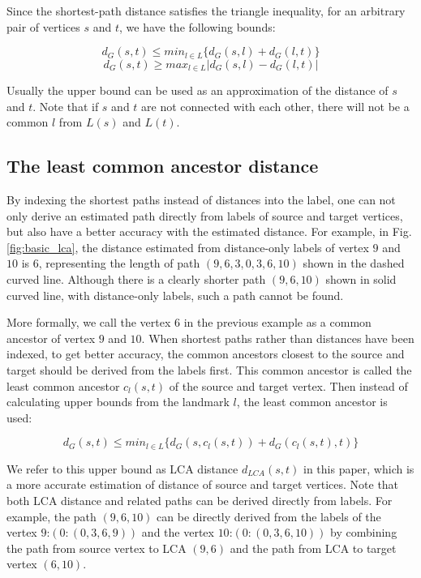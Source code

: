Since the shortest-path distance satisfies the triangle inequality, for an arbitrary pair of vertices $s$ and $t$, we have the following bounds:

\begin{equation}
\label{equ:upper}
    d_G(s,t) \leq min_{l \in L}\{d_G(s,l) + d_G(l,t)\}
\end{equation}
\begin{equation}
\label{equ:lower}
    d_G(s,t) \geq max_{l \in L}|d_G(s,l) - d_G(l,t)|
\end{equation}

Usually the upper bound can be used as an approximation of the distance of $s$ and $t$. Note that if $s$ and $t$ are not connected with each other, there will not be a common $l$ from $L(s)$ and $L(t)$.

\subsection{The least common ancestor distance}

By indexing the shortest paths instead of distances into the label, one can not only derive an estimated path directly from labels of source and target vertices, but also have a better accuracy with the estimated distance. For example, in Fig. \ref{fig:basic_lca}, the distance estimated from distance-only labels of vertex $9$ and $10$ is 6, representing the length of path $(9, 6, 3, 0, 3, 6, 10)$ shown in the dashed curved line. Although there is a clearly shorter path $(9, 6, 10)$ shown in solid curved line, with distance-only labels, such a path cannot be found. 

More formally, we call the vertex $6$ in the previous example as a common ancestor of vertex $9$ and $10$. When shortest paths rather than distances have been indexed, to get better accuracy, the common ancestors closest to the source and target should be derived from the labels first. This common ancestor is called the least common ancestor $c_l(s,t)$ of the source and target vertex. Then instead of calculating upper bounds from the landmark $l$, the least common ancestor is used:

\begin{equation}
\label{equ:lca}
    d_G(s,t) \leq min_{l \in L}\{d_G(s,c_l(s,t)) + d_G(c_l(s,t),t)\}
\end{equation}

We refer to this upper bound as LCA distance $d_{LCA}(s,t)$ in this paper, which is a more accurate estimation of distance of source and target vertices. Note that both LCA distance and related paths can be derived directly from labels. For example, the path $(9,6,10)$ can be directly derived from the labels of the vertex $9$:$(0:(0,3,6,9))$ and the vertex $10$:$(0:(0,3,6,10))$ by combining the path from source vertex to LCA $(9,6)$ and the path from LCA to target vertex $(6,10)$.
